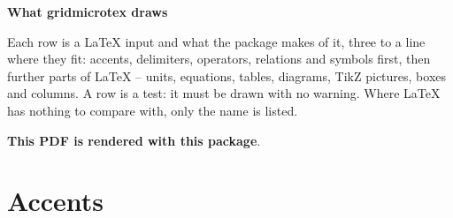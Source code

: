 \documentclass[9pt]{extarticle}
\begin{document}
\begin{center}\Large\textbf{What gridmicrotex draws}\end{center}

Each row is a LaTeX input and what the package makes of it, three to a line where they fit: accents, delimiters, operators, relations and symbols first, then further parts of LaTeX -- units, equations, tables, diagrams, TikZ pictures, boxes and columns. A row is a test: it must be drawn with no warning. Where LaTeX has nothing to compare with, only the name is listed.

\textbf{This PDF is rendered with this package}.

\section*{Accents}
\end{document}
